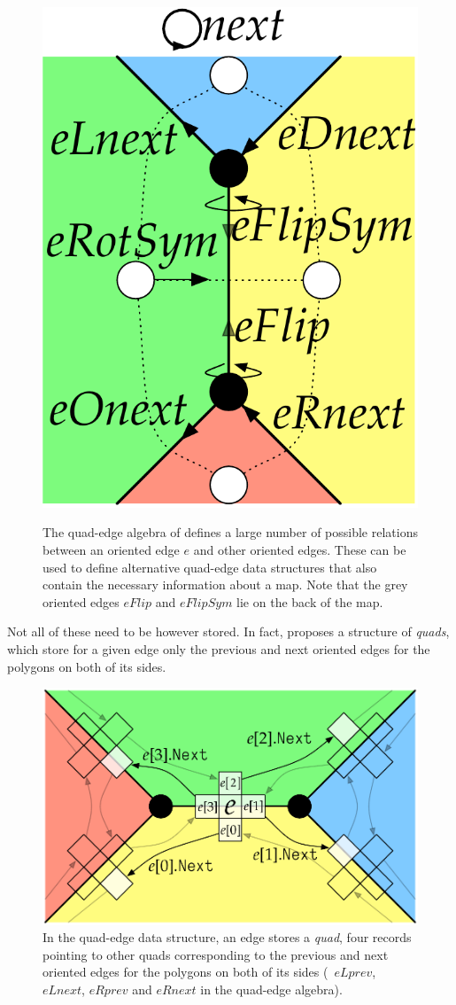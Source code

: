 \begin{figure}[tbp]
{\includegraphics[width=\marginparwidth]{figs/quad-edge-algebra-2}
\label{subfig:quad-edge-algebra-2}}
\caption[The quad-edge algebra]{The quad-edge algebra of \citet{Guibas85} defines a large number of possible relations between an oriented edge $e$ and other oriented edges.
These can be used to define alternative quad-edge data structures that also contain the necessary information about a map.
Note that the grey oriented edges $eFlip$ and $eFlipSym$ lie on the back of the map.}
\label{fig:quad-edge-algebra}
\end{figure}
Not all of these need to be however stored.
In fact, \citet{Guibas85} proposes a structure of \emph{quads}, which store for a given edge only the previous and next oriented edges for the polygons on both of its sides.
\begin{figure}[tbp]
\includegraphics[width=0.5\linewidth]{figs/quad}
\caption[The quad-edge data structure]{In the quad-edge data structure, an edge stores a \emph{quad}, four records pointing to other quads corresponding to the previous and next oriented edges for the polygons on both of its sides (\ie\ $eLprev$, $eLnext$, $eRprev$ and $eRnext$ in the quad-edge algebra).}
\label{fig:quad}
\end{figure}
